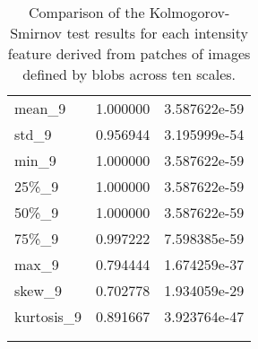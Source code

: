 \begin{longtable}{lrr}
mean\_9     &  1.000000 &  3.587622e-59 \\
std\_9      &  0.956944 &  3.195999e-54 \\
min\_9      &  1.000000 &  3.587622e-59 \\
25\%\_9      &  1.000000 &  3.587622e-59 \\
50\%\_9      &  1.000000 &  3.587622e-59 \\
75\%\_9      &  0.997222 &  7.598385e-59 \\
max\_9      &  0.794444 &  1.674259e-37 \\
skew\_9     &  0.702778 &  1.934059e-29 \\
kurtosis\_9 &  0.891667 &  3.923764e-47 \\

\\

\caption{Comparison of the Kolmogorov-Smirnov test results for each intensity feature derived from patches of images defined by blobs across ten scales.}

\end{longtable}
